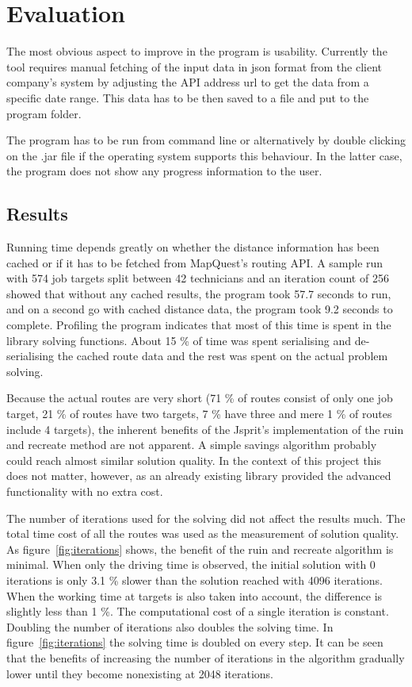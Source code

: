 \chapter{Evaluation}
\label{chapter:evaluation}


The most obvious aspect to improve in the program is usability. Currently the tool requires manual fetching of the input data in json format from the client company's system by adjusting the API address url to get the data from a specific date range. This data has to be then saved to a file and put to the program folder. 

The program has to be run from command line or alternatively by double clicking on the .jar file if the operating system supports this behaviour. In the latter case, the program does not show any progress information to the user.

\section{Results}
Running time depends greatly on whether the distance information has been cached or if it has to be fetched from MapQuest's routing API. A sample run with 574 job targets split between 42 technicians and an iteration count of 256 showed that without any cached results, the program took 57.7 seconds to run, and on a second go with cached distance data, the program took 9.2 seconds to complete. Profiling the program indicates that most of this time is spent in the library solving functions. About 15 \% of time was spent serialising and de-serialising the cached route data and the rest was spent on the actual problem solving.

Because the actual routes are very short (71 \% of routes consist of only one job target, 21 \% of routes have two targets, 7 \% have three and mere 1 \% of routes include 4 targets), the inherent benefits of the Jsprit's implementation of the ruin and recreate method are not apparent. A simple savings algorithm probably could reach almost similar solution quality. In the context of this project this does not matter, however, as an already existing library provided the advanced functionality with no extra cost. 


The number of iterations used for the solving did not affect the results much. The total time cost of all the routes was used as the measurement of solution quality. As figure~\ref{fig:iterations} shows, the benefit of the ruin and recreate algorithm is minimal. When only the driving time is observed, the initial solution with 0 iterations is only 3.1 \% slower than the solution reached with 4096 iterations. When the working time at targets is also taken into account, the difference is slightly less than 1 \%. The computational cost of a single iteration is constant. Doubling the number of iterations also doubles the solving time. In figure~\ref{fig:iterations} the solving time is doubled on every step. It can be seen that the benefits of increasing the number of iterations in the algorithm gradually lower until they become nonexisting at 2048 iterations. 

